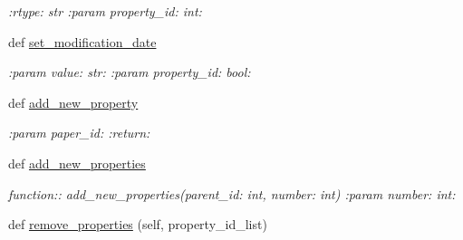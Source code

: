 \begin{DoxyCompactItemize}
\begin{DoxyCompactList}\small\item\em \+:rtype\+: str \+:param property\+\_\+id\+: int\+: \end{DoxyCompactList}\item 
def \hyperlink{classplume-creator_1_1src_1_1plume_1_1data_1_1property_1_1property__list_1_1_property_list_a6f4a544f173b14eac3b0bb3d154cb225}{set\+\_\+modification\+\_\+date}\hypertarget{classplume-creator_1_1src_1_1plume_1_1data_1_1property_1_1property__list_1_1_property_list_a6f4a544f173b14eac3b0bb3d154cb225}{}\label{classplume-creator_1_1src_1_1plume_1_1data_1_1property_1_1property__list_1_1_property_list_a6f4a544f173b14eac3b0bb3d154cb225}

\begin{DoxyCompactList}\small\item\em \+:param value\+: str\+: \+:param property\+\_\+id\+: bool\+: \end{DoxyCompactList}\item 
def \hyperlink{classplume-creator_1_1src_1_1plume_1_1data_1_1property_1_1property__list_1_1_property_list_a8c694eba418a99eed577fcdb5604b9aa}{add\+\_\+new\+\_\+property}\hypertarget{classplume-creator_1_1src_1_1plume_1_1data_1_1property_1_1property__list_1_1_property_list_a8c694eba418a99eed577fcdb5604b9aa}{}\label{classplume-creator_1_1src_1_1plume_1_1data_1_1property_1_1property__list_1_1_property_list_a8c694eba418a99eed577fcdb5604b9aa}

\begin{DoxyCompactList}\small\item\em \+:param paper\+\_\+id\+: \+:return\+: \end{DoxyCompactList}\item 
def \hyperlink{classplume-creator_1_1src_1_1plume_1_1data_1_1property_1_1property__list_1_1_property_list_a5347a7a211147afec9a46fd548a58956}{add\+\_\+new\+\_\+properties}\hypertarget{classplume-creator_1_1src_1_1plume_1_1data_1_1property_1_1property__list_1_1_property_list_a5347a7a211147afec9a46fd548a58956}{}\label{classplume-creator_1_1src_1_1plume_1_1data_1_1property_1_1property__list_1_1_property_list_a5347a7a211147afec9a46fd548a58956}

\begin{DoxyCompactList}\small\item\em function\+:\+: add\+\_\+new\+\_\+properties(parent\+\_\+id\+: int, number\+: int) \+:param number\+: int\+: \end{DoxyCompactList}\item 
def \hyperlink{classplume-creator_1_1src_1_1plume_1_1data_1_1property_1_1property__list_1_1_property_list_af425b3492b0c4a7be98c344a7ef08f6c}{remove\+\_\+properties} (self, property\+\_\+id\+\_\+list)\hypertarget{classplume-creator_1_1src_1_1plume_1_1data_1_1property_1_1property__list_1_1_property_list_af425b3492b0c4a7be98c344a7ef08f6c}{}\label{classplume-creator_1_1src_1_1plume_1_1data_1_1property_1_1property__list_1_1_property_list_af425b3492b0c4a7be98c344a7ef08f6c}


\end{DoxyCompactItemize}
